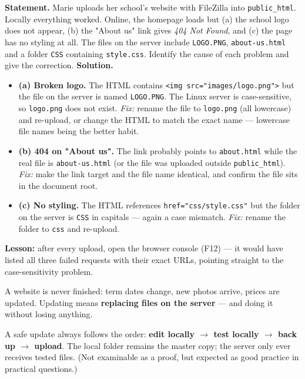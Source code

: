 \documentclass[11pt]{article}
\newcounter{popsec}
\newcounter{popsub}
\newcommand{\courssub}[1]{%
  \stepcounter{popsub}%
  \par\vspace{9pt}\noindent{\popxbold\fontsize{11.5}{13}\selectfont\color{popink}{\color{poporange}\thepopsec.\thepopsub}\hspace{6pt}#1}\par\nopagebreak\vspace{4pt}
}
\begin{document}
\begin{exoresolu}
\textbf{Statement.} Marie uploads her school's website with FileZilla into \texttt{public\_html}. Locally everything worked. Online, the homepage loads but (a) the school logo does not appear, (b) the "About us" link gives \emph{404 Not Found}, and (c) the page has no styling at all. The files on the server include \texttt{LOGO.PNG}, \texttt{about-us.html} and a folder \texttt{CSS} containing \texttt{style.css}. Identify the cause of each problem and give the correction.
\tcblower
\textbf{Solution.}
\begin{itemize}
\item \textbf{(a) Broken logo.} The HTML contains \texttt{<img src="images/logo.png">} but the file on the server is named \texttt{LOGO.PNG}. The Linux server is case-sensitive, so \texttt{logo.png} does not exist. \emph{Fix:} rename the file to \texttt{logo.png} (all lowercase) and re-upload, or change the HTML to match the exact name — lowercase file names being the better habit.
\item \textbf{(b) 404 on "About us".} The link probably points to \texttt{about.html} while the real file is \texttt{about-us.html} (or the file was uploaded outside \texttt{public\_html}). \emph{Fix:} make the link target and the file name identical, and confirm the file sits in the document root.
\item \textbf{(c) No styling.} The HTML references \texttt{href="css/style.css"} but the folder on the server is \texttt{CSS} in capitals — again a case mismatch. \emph{Fix:} rename the folder to \texttt{css} and re-upload.
\end{itemize}
\textbf{Lesson:} after every upload, open the browser console (F12) — it would have listed all three failed requests with their exact URLs, pointing straight to the case-sensitivity problem.
\end{exoresolu}

\courssub{Updating a Hosted Site Safely}

A website is never finished: term dates change, new photos arrive, prices are updated. Updating means \textbf{replacing files on the server} — and doing it without losing anything.

\begin{propriete}
A safe update always follows the order: \textbf{edit locally $\rightarrow$ test locally $\rightarrow$ back up $\rightarrow$ upload}. The local folder remains the master copy; the server only ever receives tested files. (Not examinable as a proof, but expected as good practice in practical questions.)
\end{propriete}
\end{document}
